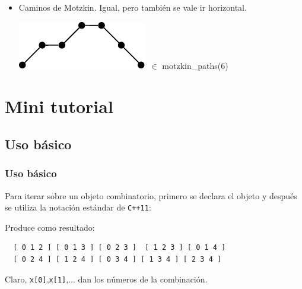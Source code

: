 \documentclass[spanish,professionalfonts]{beamer}
\def\tcb#1{\textcolor{MyBlue}{#1}}
\begin{document}
\begin{frame}
\begin{itemize}
    \item \tcb{Caminos de Motzkin}. Igual, pero también se vale ir horizontal.
    \begin{center}
      \includegraphics[scale=0.6]{./motzkin.pdf} $\ \in$ motzkin\_paths(6) 
    \end{center}

  \end{itemize}
\end{frame}

\section{Mini tutorial}

\subsection{Uso básico}


\begin{frame}[fragile]\frametitle{Uso básico}
Para iterar sobre un objeto combinatorio, primero se declara el objeto y después se utiliza la notación estándar de \texttt{C++11}: \pause

 \combsencillo
 
 \pause
 Produce como resultado:
  \begin{verbatim} 
  [ 0 1 2 ] [ 0 1 3 ] [ 0 2 3 ]  [ 1 2 3 ] [ 0 1 4 ] 
  [ 0 2 4 ] [ 1 2 4 ] [ 0 3 4 ] [ 1 3 4 ] [ 2 3 4 ] 
  \end{verbatim}

  Claro, \texttt{x[0]},\texttt{x[1]},... dan los números de la combinación. 
\end{frame}

\end{document}
